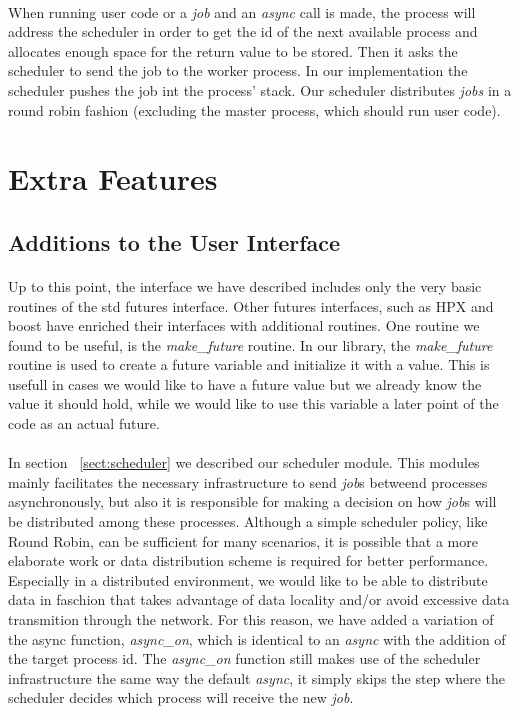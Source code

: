 \paragraph{}
When running user code or a \emph{job} and an \emph{async} call is made, the process will address the scheduler in order
to get the id of the next available process and allocates enough space for the return value to be stored.
Then it asks the scheduler to send the job to the worker process.  In our implementation the scheduler 
pushes the job int the process' stack.  Our scheduler distributes \emph{jobs} in a round robin fashion 
(excluding the master process, which should run user code). 

\section{Extra Features}
\label{sect:extra_features}

\subsection{Additions to the User Interface}
\paragraph{}
Up to this point, the interface we have described includes only the very basic routines of the std futures interface.
Other futures interfaces, such as HPX and boost have enriched their interfaces with additional routines.  One routine
we found to be useful, is the \emph{make\_future} routine.  In our library, the \emph{make\_future} routine is used
to create a future variable and initialize it with a value.  This is usefull in cases we would like to have a future
value but we already know the value it should hold, while we would like to use this variable a later point of the code
as an actual future.

\paragraph{}
In section ~\ref{sect:scheduler} we described our scheduler module.  This modules mainly facilitates the necessary 
infrastructure to send \emph{job}s betweend processes asynchronously, but also it is responsible for making a decision
on how \emph{job}s will be distributed among these processes.  Although a simple scheduler policy, like Round Robin, 
can be sufficient for many scenarios, it is possible that a more elaborate work or data distribution scheme is required
for better performance.  Especially in a distributed environment, we would like to be able to distribute data in faschion
that takes advantage of data locality and/or avoid excessive data transmition through the network.  For this reason, we
have added a variation of the async function, \emph{async\_on}, which is identical to an \emph{async} with the addition of
the target process id.  The \emph{async\_on} function still makes use of the scheduler infrastructure the same way
the default \emph{async}, it simply skips the step where the scheduler decides which process will receive the new 
\emph{job}.

